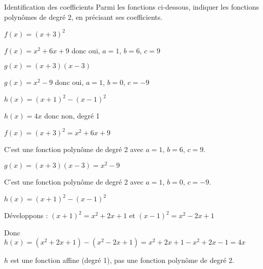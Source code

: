 \begin{EXO}{Identification des coefficients}{}
 Parmi les fonctions ci-dessous, indiquer les fonctions polynômes de degré $2$, en précisant ses coefficients.
\begin{tcbenumerate}[3]
\tcbitem $f(x) = (x+3)^2$

\begin{crep}
$f(x) = x^2+6x+9$ donc oui, $a=1$, $b=6$, $c=9$
\end{crep}

\tcbitem $g(x)= (x+3)(x-3)$

\begin{crep}
$g(x) = x^2-9$ donc oui, $a=1$, $b=0$, $c=-9$
\end{crep}

\tcbitem $h(x)= (x+1)^2-(x-1)^2$

\begin{crep}
$h(x) = 4x$ donc non, degré 1
\end{crep}
\end{tcbenumerate}

\exocorrection

\begin{tcbenumerate}[3]
\tcbitem $f(x) = (x+3)^2 = x^2+6x+9$

C'est une fonction polynôme de degré 2 avec $a=1$, $b=6$, $c=9$.

\tcbitem $g(x)= (x+3)(x-3) = x^2-9$

C'est une fonction polynôme de degré 2 avec $a=1$, $b=0$, $c=-9$.

\tcbitem $h(x)= (x+1)^2-(x-1)^2$

Développons : $(x+1)^2 = x^2+2x+1$ et $(x-1)^2 = x^2-2x+1$

Donc $h(x) = (x^2+2x+1)-(x^2-2x+1) = x^2+2x+1-x^2+2x-1 = 4x$

$h$ est une fonction affine (degré 1), pas une fonction polynôme de degré 2.
\end{tcbenumerate}
\end{EXO}